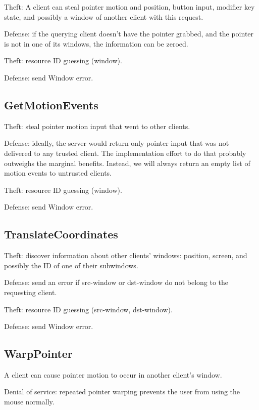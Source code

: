 \documentclass{article}
\begin{document}
Theft: A client can steal pointer motion and position, button input,
modifier key state, and possibly a window of another client with this
request.

Defense: if the querying client doesn't have the pointer grabbed, and
the pointer is not in one of its windows, the information can be
zeroed.

Theft: resource ID guessing (window).

Defense: send Window error.



\subsection{GetMotionEvents}

Theft: steal pointer motion input that went to other clients.

Defense: ideally, the server would return only pointer input that was
not delivered to any trusted client.  The implementation effort to do
that probably outweighs the marginal benefits.  Instead, we will
always return an empty list of motion events to untrusted clients.

Theft: resource ID guessing (window).

Defense: send Window error.



\subsection{TranslateCoordinates}

Theft: discover information about other clients' windows: position,
screen, and possibly the ID of one of their subwindows.

Defense: send an error if src-window or dst-window do not belong
to the requesting client.

Theft: resource ID guessing (src-window, dst-window).

Defense: send Window error.



\subsection{WarpPointer}

A client can cause pointer motion to occur in another client's window.

Denial of service: repeated pointer warping prevents the user from
using the mouse normally.
\end{document}
